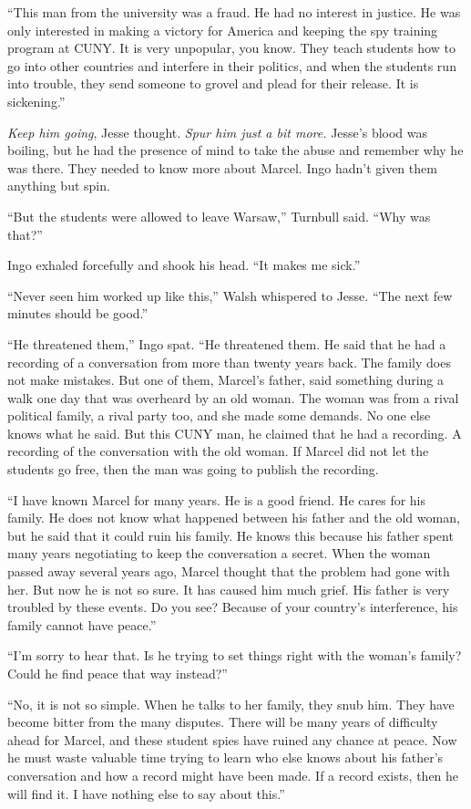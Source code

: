 \documentclass[12pt]{book}
\begin{document}
``This man from the university was a fraud.  He had no interest in justice.  He was only interested in making a victory for America and keeping the spy training program at CUNY.  It is very unpopular, you know.  They teach students how to go into other countries and interfere in their politics, and when the students run into trouble, they send someone to grovel and plead for their release.  It is sickening.''

\emph{Keep him going}, Jesse thought.  \emph{Spur him just a bit more.}  Jesse's blood was boiling, but he had the presence of mind to take the abuse and remember why he was there.  They needed to know more about Marcel.  Ingo hadn't given them anything but spin.

``But the students were allowed to leave Warsaw,'' Turnbull said.  ``Why was that?''

Ingo exhaled forcefully and shook his head.  ``It makes me sick.''

``Never seen him worked up like this,'' Walsh whispered to Jesse.  ``The next few minutes should be good.''

``He threatened them,'' Ingo spat.  ``He threatened them.  He said that he had a recording of a conversation from more than twenty years back.  The family does not make mistakes.  But one of them, Marcel's father, said something during a walk one day that was overheard by an old woman.  The woman was from a rival political family, a rival party too, and she made some demands.  No one else knows what he said.  But this CUNY man, he claimed that he had a recording.  A recording of the conversation with the old woman.  If Marcel did not let the students go free, then the man was going to publish the recording.

``I have known Marcel for many years.  He is a good friend.  He cares for his family.  He does not know what happened between his father and the old woman, but he said that it could ruin his family.  He knows this because his father spent many years negotiating to keep the conversation a secret.  When the woman passed away several years ago, Marcel thought that the problem had gone with her.  But now he is not so sure.  It has caused him much grief.  His father is very troubled by these events.  Do you see?  Because of your country's interference, his family cannot have peace.''

``I'm sorry to hear that.  Is he trying to set things right with the woman's family?  Could he find peace that way instead?''

``No, it is not so simple.  When he talks to her family, they snub him.  They have become bitter from the many disputes.  There will be many years of difficulty ahead for Marcel, and these student spies have ruined any chance at peace.  Now he must waste valuable time trying to learn who else knows about his father's conversation and how a record might have been made.  If a record exists, then he will find it.  I have nothing else to say about this.''
\end{document}
